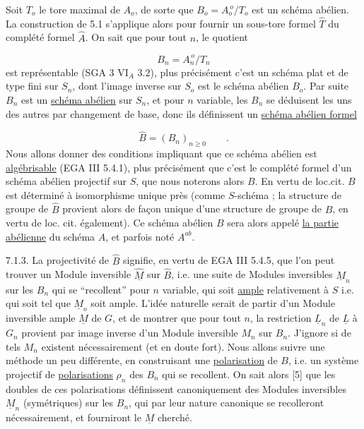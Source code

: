 Soit $T_o$ le tore maximal de $A_o$, de sorte que $B_o = A_o^{\,o}/T_o$ est un schéma abélien. La construction de 5.1 s'applique alors pour fournir un sous-tore formel $\hat{T}$ du complété formel $\hat{A}$. On sait que pour tout $n$, le quotient

\begin{equation}\tag{7.1.1}
B_n = A_n^{\,o}/T_n
\end{equation}
est représentable (SGA 3 $\mathrm{VI}_A$ 3.2), plus précisément c'est un schéma plat et de type fini sur $S_n$, dont l'image inverse sur $S_o$ est le schéma abélien $B_o$. Par suite $B_n$ est un \underline{schéma abélien} sur $S_n$, et pour $n$ variable, les $B_n$ se déduisent les uns des autres par changement de base, donc ils définissent un \underline{schéma abélien formel}

\begin{equation}\tag{7.1.2}
\hat{B} = (B_n)_{n \geqslant 0} \qquad .
\end{equation}
Nous allons donner des conditions impliquant que ce schéma abélien est \underline{algébrisable} (EGA III 5.4.1), plus précisément que c'est le complété formel d'un schéma abélien projectif sur $S$, que nous noterons alors $B$. En vertu de loc.cit. $B$ est déterminé à isomorphisme unique près (comme $S$-schéma ; la structure de groupe de $\hat{B}$ provient alors de façon unique d'une structure de groupe de $B$, en vertu de loc. cit. également). Ce schéma abélien $B$ sera alors appelé \underline{la partie abélienne} du schéma $A$, et parfois noté $A^{ab}$.



7.1.3. La projectivité de $\hat{B}$ signifie, en vertu de EGA III 5.4.5, que l'on peut trouver un Module inversible $\underline{\hat{M}}$ sur $\hat{B}$, i.e. une suite de Modules inversibles $\underline{M}_n$ sur les $B_n$ qui se ``recollent'' pour $n$ variable, qui soit \underline{ample} relativement à $S$ i.e. qui soit tel que $\underline{M}_o$ soit ample. L'idée naturelle serait de partir d'un Module inversible ample $\underline{M}$ de $G$, et de montrer que pour tout $n$, la restriction $\underline{L}_n$ de $\underline{L}$ à $G_n$ provient par image inverse d'un Module inversible $M_n$ sur $B_n$. J'ignore si de tels $M_n$ existent nécessairement (et en doute fort). Nous allons suivre une méthode un peu différente, en construisant une \underline{polarisation} de $B$, i.e. un système projectif de \underline{polarisations} $\rho_n$ des $B_n$ qui se recollent. On sait alors [5] que les doubles de ces polarisations définissent canoniquement des Modules inversibles $\underline{M}_n$ (symétriques) sur les $B_n$, qui par leur nature canonique se recolleront nécessairement, et fourniront le $\underline{M}$ cherché.

